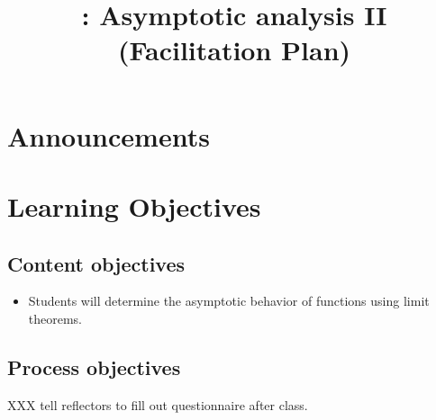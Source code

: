 \documentclass{tufte-handout}
\title{\thecourse: Asymptotic analysis II (Facilitation Plan)}
\date{}
\begin{document}
\maketitle

\section{Announcements}

\section{Learning Objectives}

\subsection{Content objectives}

\begin{itemize}
\item Students will determine the asymptotic behavior of functions
  using limit theorems.
\end{itemize}

\subsection{Process objectives}

XXX tell reflectors to fill out questionnaire after class.
\end{document}
